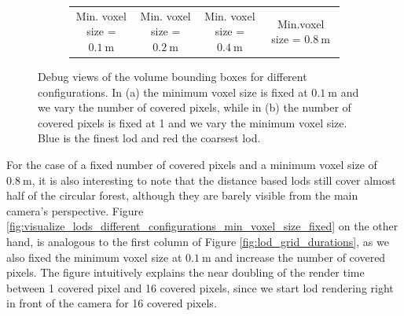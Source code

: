 \begin{figure}[t]
\begin{subfigure}[b]{\linewidth}
\begin{center}
\begin{tabular}{ c c c c  }
                {\footnotesize Min. voxel size = $\SI{0.1}{\m}$} & {\footnotesize Min. voxel size = $\SI{0.2}{\m}$} & {\footnotesize Min. voxel size = $\SI{0.4}{\m}$} & {\footnotesize Min.\newline voxel size = $\SI{0.8}{\m}$}\\
            \end{tabular}
        \end{center}
        \caption{}
        \label{fig:visualize_lods_different_configurations_covered_pixels_fixed}
    \end{subfigure}
    \caption[Visualization of \acsp{lod} using different configurations]{Debug views of the volume bounding boxes for different configurations. In (a) the minimum voxel size is fixed at $\SI{0.1}{\m}$ and we vary the number of covered pixels, while in (b) the number of covered pixels is fixed at 1 and we vary the minimum voxel size. Blue is the finest \ac{lod} and red the coarsest \ac{lod}. }
    \label{fig:visualize_lods_different_configurations}
\end{figure}
For the case of a fixed number of covered pixels and a minimum voxel size of $\SI{0.8}{\m}$, it is also interesting to note that the distance based \acsp{lod} still cover almost half of the circular forest, although they are barely visible from the main camera's perspective.
Figure \ref{fig:visualize_lods_different_configurations_min_voxel_size_fixed} on the other hand, is analogous to the first column of Figure \ref{fig:lod_grid_durations}, as we also fixed the minimum voxel size at $\SI{0.1}{\m}$ and increase the number of covered pixels.
The figure intuitively explains the near doubling of the render time between 1 covered pixel and 16 covered pixels, since we start \ac{lod} rendering right in front of the camera for 16 covered pixels.


